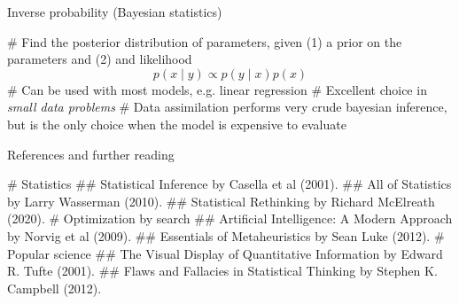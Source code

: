 \documentclass[12pt, aspectratio=149]{beamer}
\theoremstyle{plain}
\begin{document}
\begin{frame}[fragile]{Inverse probability (Bayesian statistics)}
	\begin{easylist}[itemize]
		# Find the posterior distribution of parameters, given (1)
		a prior on the parameters and (2) and likelihood
		\begin{equation*}
		p(x \mid y) \propto p(y \mid x) p(x)
		\end{equation*}
		# Can be used with most models, e.g. linear regression
		# Excellent choice in \emph{small data problems}
		# Data assimilation performs very crude 
		bayesian inference, but is the only choice when the model is expensive to evaluate
	\end{easylist}
\end{frame}



\begin{frame}[fragile]{References and further reading}
\scriptsize
\begin{easylist}[itemize]
# Statistics
## Statistical Inference by Casella et al (2001).
## All of Statistics by Larry Wasserman (2010).
## Statistical Rethinking by Richard McElreath (2020).
# Optimization by search
## Artificial Intelligence: A Modern Approach by Norvig et al (2009).
## Essentials of Metaheuristics by Sean Luke (2012).
# Popular science
## The Visual Display of Quantitative Information by Edward R. Tufte (2001).
## Flaws and Fallacies in Statistical Thinking by Stephen K. Campbell (2012).
\end{easylist}
\normalsize
\end{frame}
\end{document}
